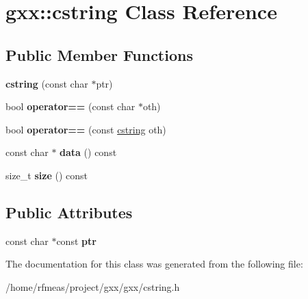 \hypertarget{classgxx_1_1cstring}{}\section{gxx\+:\+:cstring Class Reference}
\label{classgxx_1_1cstring}
\subsection*{Public Member Functions}
\begin{DoxyCompactItemize}
\item 
{\bfseries cstring} (const char $\ast$ptr)\hypertarget{classgxx_1_1cstring_a4803ee530431722ba9dbeb212d052896}{}\label{classgxx_1_1cstring_a4803ee530431722ba9dbeb212d052896}

\item 
bool {\bfseries operator==} (const char $\ast$oth)\hypertarget{classgxx_1_1cstring_a6f521cc316fbb56313fef754bfa7dde4}{}\label{classgxx_1_1cstring_a6f521cc316fbb56313fef754bfa7dde4}

\item 
bool {\bfseries operator==} (const \hyperlink{classgxx_1_1cstring}{cstring} oth)\hypertarget{classgxx_1_1cstring_a4c81f9d963e87eae1d19d8a8ddb8eba8}{}\label{classgxx_1_1cstring_a4c81f9d963e87eae1d19d8a8ddb8eba8}

\item 
const char $\ast$ {\bfseries data} () const \hypertarget{classgxx_1_1cstring_a818fb4318548e1b397f548d1193ac3e3}{}\label{classgxx_1_1cstring_a818fb4318548e1b397f548d1193ac3e3}

\item 
size\+\_\+t {\bfseries size} () const \hypertarget{classgxx_1_1cstring_a66b41fae9f124dbfb36cc6ed1a65fde7}{}\label{classgxx_1_1cstring_a66b41fae9f124dbfb36cc6ed1a65fde7}

\end{DoxyCompactItemize}
\subsection*{Public Attributes}
\begin{DoxyCompactItemize}
\item 
const char $\ast$const {\bfseries ptr}\hypertarget{classgxx_1_1cstring_a4a13d7b0c5eb2f49799e97f4aefcec96}{}\label{classgxx_1_1cstring_a4a13d7b0c5eb2f49799e97f4aefcec96}

\end{DoxyCompactItemize}


The documentation for this class was generated from the following file\+:\begin{DoxyCompactItemize}
\item 
/home/rfmeas/project/gxx/gxx/cstring.\+h\end{DoxyCompactItemize}
